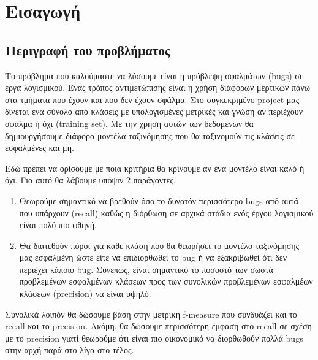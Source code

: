 \chapter{Εισαγωγή}
\section{Περιγραφή του προβλήματος}

Το πρόβλημα που καλούμαστε να λύσουμε είναι η πρόβλεψη σφαλμάτων (bugs) σε έργα λογισμικού.
Ένας τρόπος αντιμετώπισης είναι η χρήση διάφορων μερτικών πάνω στα τμήματα που έχουν και που δεν έχουν σφάλμα. Στο συγκεκριμένο project μας δίνεται ένα σύνολο από κλάσεις με υπολογισμένες μετρικές και γνώση αν περιέχουν σφάλμα ή όχι (training set). Με την χρήση αυτών των δεδομένων θα δημιουργήσουμε διάφορα μοντέλα ταξινόμησης που θα ταξινομούν τις κλάσεις σε εσφαλμένες και μη.

Εδώ πρέπει να ορίσουμε με ποια κριτήρια θα κρίνουμε αν ένα μοντέλο είναι καλό ή όχι. Για αυτό θα λάβουμε υπόψιν 2 παράγοντες.
\begin{enumerate}
\item Θεωρούμε σημαντικό να βρεθούν όσο το δυνατόν περισσότερο bugs από αυτά που υπάρχουν (recall) καθώς η διόρθωση σε αρχικά στάδια ενός έργου λογισμικού είναι πολύ πιο φθηνή.
\item Θα διατεθούν πόροι για κάθε κλάση που θα θεωρήσει το μοντέλο ταξινόμησης μας εσφαλμένη ώστε είτε να επιδιορθωθεί το bug ή να εξακριβωθεί ότι δεν περιέχει κάποιο bug. Συνεπώς, είναι σημαντικό το ποσοστό των  σωστά προβλεμένων εσφαλμένων κλάσεων προς των συνολικών προβλεμένων εσφαλμέων κλάσεων (precision) να είναι υψηλό.
\end{enumerate}

Συνολικά λοιπόν θα δώσουμε βάση στην μετρική f-measure που συνδυάζει και το recall και το precision. Ακόμη, θα δώσουμε περισσότερη έμφαση στο recall σε σχέση με το precision γιατί θεωρούμε ότι είναι πιο οικονομικό να διορθωθούν πολλά bugs στην αρχή παρά στο λίγα στο τέλος. 
\newpage
